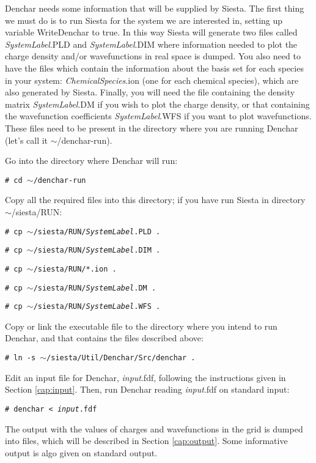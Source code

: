  {\sc Denchar} needs some information that will be supplied by {\sc Siesta}. 
 The first thing we must do is to run {\sc Siesta} for 
 the system we are interested in,
 setting up variable WriteDenchar to true. 
 In this way {\sc Siesta} will generate
 two files called {\it SystemLabel}.PLD and {\it SystemLabel}.DIM
 where information 
 needed to plot the charge density and/or wavefunctions 
 in real space is dumped. You also need to have the files which
 contain the information about the basis set for each species
 in your system: {\it ChemicalSpecies}.ion (one for each
 chemical species), which
 are also generated by  {\sc Siesta}.
 Finally, you will need the file containing the
 density matrix {\it SystemLabel}.DM if you wish to plot
 the charge density, or that containing the wavefunction
 coefficients {\it SystemLabel}.WFS if you want to plot
 wavefunctions. These files need to be present in the
 directory where you are running {\sc Denchar} (let's call it
 $\sim$/denchar-run).

 Go into the directory where {\sc Denchar} will run:

 {\tt \# cd $\sim$/denchar-run}

 Copy all the required files into this directory; if you
 have run {\sc Siesta} in directory $\sim$/siesta/RUN:

 {\tt \# cp $\sim$/siesta/RUN/{\it SystemLabel}.PLD .}

 {\tt \# cp $\sim$/siesta/RUN/{\it SystemLabel}.DIM .}

 {\tt \# cp $\sim$/siesta/RUN/*.ion .}

 {\tt \# cp $\sim$/siesta/RUN/{\it SystemLabel}.DM .}

 {\tt \# cp $\sim$/siesta/RUN/{\it SystemLabel}.WFS .}

 Copy or link the executable file to the directory
 where you intend to run  {\sc Denchar}, and that
 contains the files described above:

 {\tt \# ln -s $\sim$/siesta/Util/Denchar/Src/denchar . }

 Edit an input file for {\sc Denchar}, {\it input}.fdf, following the 
 instructions given in Section \ref{cap:input}. Then,
 run  {\sc Denchar} reading {\it input}.fdf on
 standard input:


 {\tt \# denchar < {\it input}.fdf } 


 The output with the values of charges and wavefunctions
 in the grid is dumped into files, which will be described
 in Section \ref{cap:output}. Some informative output is
 algo given on standard output.

